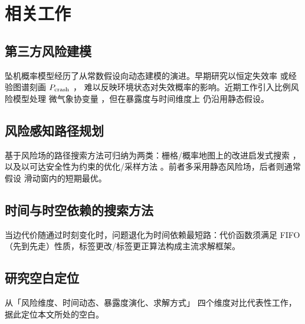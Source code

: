 
\section{相关工作}
\label{sec:related-work}

\subsection{第三方风险建模}

坠机概率模型经历了从常数假设向动态建模的演进。早期研究以恒定失效率
或经验图谱刻画 $P_{\mathrm{crash}}$ \citep{primatesta2022review}，
难以反映环境状态对失效概率的影响。近期工作引入比例风险模型处理
微气象协变量 \citep{cooper2023proportional}，但在暴露度与时间维度上
仍沿用静态假设。

\subsection{风险感知路径规划}

基于风险场的路径搜索方法可归纳为两类：栅格/概率地图上的改进启发式搜索
\citep{zhang2024spatiotemporal}，以及以可达安全性为约束的优化/采样方法
\citep{chen2024costastar}。前者多采用静态风险场，后者则通常假设
滑动窗内的短期最优。

\subsection{时间与时空依赖的搜索方法}

当边代价随通过时刻变化时，问题退化为时间依赖最短路：代价函数须满足
FIFO（先到先走）性质，标签更改/标签更正算法构成主流求解框架。

\subsection{研究空白定位}

 从「风险维度、时间动态、暴露度演化、求解方式」
四个维度对比代表性工作，据此定位本文所处的空白。


